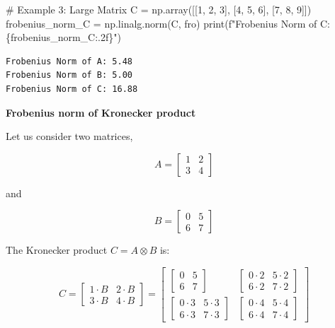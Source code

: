 \documentclass[
  letterpaper,
  DIV=11,
  numbers=noendperiod]{scrreprt}
\newenvironment{Shaded}{\begin{snugshade}}{\end{snugshade}}
\newcommand{\BuiltInTok}[1]{\textcolor[rgb]{0.00,0.23,0.31}{#1}}
\newcommand{\CommentTok}[1]{\textcolor[rgb]{0.37,0.37,0.37}{#1}}
\newcommand{\DecValTok}[1]{\textcolor[rgb]{0.68,0.00,0.00}{#1}}
\newcommand{\NormalTok}[1]{\textcolor[rgb]{0.00,0.23,0.31}{#1}}
\newcommand{\OperatorTok}[1]{\textcolor[rgb]{0.37,0.37,0.37}{#1}}
\newcommand{\SpecialCharTok}[1]{\textcolor[rgb]{0.37,0.37,0.37}{#1}}
\newcommand{\SpecialStringTok}[1]{\textcolor[rgb]{0.13,0.47,0.30}{#1}}
\newcommand{\StringTok}[1]{\textcolor[rgb]{0.13,0.47,0.30}{#1}}
\theoremstyle{plain}
\theoremstyle{definition}
\theoremstyle{remark}
\begin{document}
\begin{tcolorbox}
\begin{Shaded}
\begin{Highlighting}[]
\CommentTok{\# Example 3: Large Matrix}
\NormalTok{C }\OperatorTok{=}\NormalTok{ np.array([[}\DecValTok{1}\NormalTok{, }\DecValTok{2}\NormalTok{, }\DecValTok{3}\NormalTok{], [}\DecValTok{4}\NormalTok{, }\DecValTok{5}\NormalTok{, }\DecValTok{6}\NormalTok{], [}\DecValTok{7}\NormalTok{, }\DecValTok{8}\NormalTok{, }\DecValTok{9}\NormalTok{]])}
\NormalTok{frobenius\_norm\_C }\OperatorTok{=}\NormalTok{ np.linalg.norm(C, }\StringTok{\textquotesingle{}fro\textquotesingle{}}\NormalTok{)}
\BuiltInTok{print}\NormalTok{(}\SpecialStringTok{f"Frobenius Norm of C: }\SpecialCharTok{\{}\NormalTok{frobenius\_norm\_C}\SpecialCharTok{:.2f\}}\SpecialStringTok{"}\NormalTok{)}
\end{Highlighting}
\end{Shaded}

\begin{verbatim}
Frobenius Norm of A: 5.48
Frobenius Norm of B: 5.00
Frobenius Norm of C: 16.88
\end{verbatim}

\textbf{Frobenius norm of Kronecker product}

Let us consider two matrices,

\[A = \begin{bmatrix}
1 & 2 \\
3 & 4
\end{bmatrix}\]

and

\[B = \begin{bmatrix}
0 & 5 \\
6 & 7
\end{bmatrix}\]

The Kronecker product \(C = A \otimes B\) is:

\[C = \begin{bmatrix}
1 \cdot B & 2 \cdot B \\
3 \cdot B & 4 \cdot B
\end{bmatrix}
= \begin{bmatrix}
\begin{bmatrix}
0 & 5 \\
6 & 7
\end{bmatrix} & \begin{bmatrix}
0 \cdot 2 & 5 \cdot 2 \\
6 \cdot 2 & 7 \cdot 2
\end{bmatrix} \\
\begin{bmatrix}
0 \cdot 3 & 5 \cdot 3 \\
6 \cdot 3 & 7 \cdot 3
\end{bmatrix} & \begin{bmatrix}
0 \cdot 4 & 5 \cdot 4 \\
6 \cdot 4 & 7 \cdot 4
\end{bmatrix}
\end{bmatrix}\]


\end{tcolorbox}
\end{document}
